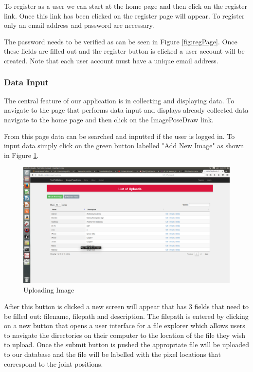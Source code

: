 \documentclass{scrreprt}
\begin{document}
To register as a user we can start at the home page and then click on the
register link.  Once this link has been clicked on the register page will
appear.  To register only an email address and password are necessary.

The password needs to be verified as can be seen in Figure \ref{fig:regPage}.
Once these fields are filled out and the register button is clicked a user
account will be created.  Note that each user account must have a unique email
address.

\subsubsection{Data Input}

The central feature of our application is in collecting and displaying data.
To navigate to the page that performs data input and displays already collected
data navigate to the home page and then click on the ImagePoseDraw link.

From this page data can be searched and inputted if the user is logged in.  To
input data simply click on the green button labelled "Add New Image" as shown
in Figure \ref{fig:uploadPage}.

\begin{figure}
  \includegraphics[width=\linewidth]{uploadPage.png}
  \caption{Uploading Image}
  \label{fig:uploadPage}
\end{figure}

After this button is clicked a new screen will appear that has 3 fields that
need to be filled out: filename, filepath and description.  The filepath is
entered by clicking on a new button that opens a user interface for a file
explorer which allows users to navigate the directories on their computer to
the location of the file they wish to upload.  Once the submit button is pushed
the appropriate file will be uploaded to our database and the file will be
labelled with the pixel locations that correspond to the joint positions.
\end{document}
